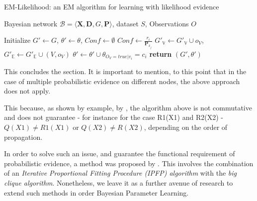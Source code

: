 \documentclass[11pt]{article}
\begin{document}
\begin{article}
\algrenewcommand\algorithmicindent{1.5em}%

\begin{algorithm*}[h!]
\caption{EM-Likelihood: an EM algorithm for learning with likelihood evidence}
\label{alg:EM-Likelihood}
\vspace{-10pt}
\begin{multicols}{2}
\begin{algorithmic}[1] 
\Require Bayesian network $\mathcal{B}=\langle \mathbf{X},\mathbf{D}, G, \mathbf{P} \rangle$, dataset $S$, Observations $O$

  \State Initialize $G'\leftarrow G$, $\theta'\leftarrow\theta$, $Conf \leftarrow \emptyset$
    
    $Conf \leftarrow \frac{r_i}{\mathbf{P}_{x_j}}$ 
  \EndFor
    \State $G'_{\mathbb{V}}\leftarrow G'_{\mathbb{V}}\cup o_{V}$, $G'_{\mathbb{E}}\leftarrow G'_{\mathbb{E}}\cup(V,o_{V})$      
       
      \State $\theta'\leftarrow\theta'\cup\theta_{O_{V}=true|v_{i}}=c_{i}$ 
    \EndFor
  \EndFor
\State \textbf{return} $(G',\theta')$
\end{algorithmic}
\end{multicols}
\end{algorithm*}

This concludes the section. It is important to mention, to this
point that in the case of multiple probabilistic evidence on
different nodes, the above approach does not apply.

This because, as shown by example, by \cite{PENG_2010}, the algorithm
above is not commutative and does not guarantee - for instance for
the case R1(X1) and R2(X2) - \(Q(X1) \neq R1(X1)\) or \(Q(X2) \neq
   R(X2)\), depending on the order of propagation.

In order to solve such an issue, and guarantee the functional
requirement of probabilistic evidence, a method was proposed by
\cite{PENG_2010}. This involves the combination of an \emph{Iterative
Proportional Fitting Procedure (IPFP) algorithm} with the \emph{big
clique algorithm}. Nonetheless, we leave it as a further avenue of
research to extend such methods in order Bayesian Parameter
Learning.


\end{article}
\end{document}
